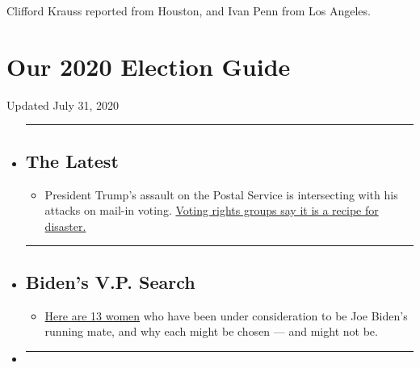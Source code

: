 Clifford Krauss reported from Houston, and Ivan Penn from Los Angeles.

\hypertarget{our-2020-election-guide}{%
\section{Our 2020 Election Guide}\label{our-2020-election-guide}}

Updated July 31, 2020

\begin{itemize}
\item
  \begin{center}\rule{0.5\linewidth}{\linethickness}\end{center}

  \hypertarget{the-latest}{%
  \subsection{The Latest}\label{the-latest}}

  \begin{itemize}
  \tightlist
  \item
    President Trump's assault on the Postal Service is intersecting with
    his attacks on mail-in voting.
    \href{https://www.nytimes3xbfgragh.onion/2020/07/31/us/politics/trump-usps-mail-delays.html?action=click\&pgtype=Article\&state=default\&region=BELOW_MAIN_CONTENT\&context=storylines_guide}{Voting
    rights groups say it is a recipe for disaster.}
  \end{itemize}
\item
  \begin{center}\rule{0.5\linewidth}{\linethickness}\end{center}

  \hypertarget{bidens-vp-search}{%
  \subsection{Biden's V.P. Search}\label{bidens-vp-search}}

  \begin{itemize}
  \tightlist
  \item
    \href{https://www.nytimes3xbfgragh.onion/article/biden-vice-president-2020.html?action=click\&pgtype=Article\&state=default\&region=BELOW_MAIN_CONTENT\&context=storylines_guide}{Here
    are 13 women} who have been under consideration to be Joe Biden's
    running mate, and why each might be chosen --- and might not be.
  \end{itemize}
\item
  \begin{center}\rule{0.5\linewidth}{\linethickness}\end{center}


\end{itemize}
